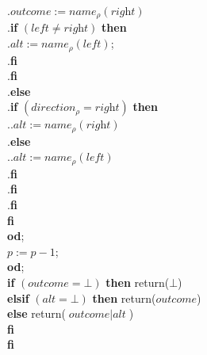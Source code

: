 \documentclass[adraft]{eptcs}
\begin{document}
\quad \quad \quad \quad .\quad \quad \quad \quad $\textit{outcome} := \textit{name}_\rho(\textit{right})$ \\ \mbox{}
\quad \quad \quad \quad .\quad \quad \quad \quad \textbf{if} $(\textit{left} \neq \textit{right})$ \textbf{then} \\ \mbox{}
\quad \quad \quad \quad .\quad \quad \quad \quad \quad $\textit{alt} := \textit{name}_\rho(\textit{left})$; \\ \mbox{}
\quad \quad \quad \quad .\quad \quad \quad \quad \textbf{fi} \\ \mbox{}
\quad \quad \quad \quad .\quad \quad \quad \textbf{fi} \\ \mbox{}
\quad \quad \quad \quad .\quad \quad \textbf{else} \\ \mbox{}
\quad \quad \quad \quad .\quad \quad \quad  \textbf{if} $(\textit{direction}_\rho = \textit{right})$ \textbf{then} \\ \mbox{}
\quad \quad \quad \quad .\quad \quad \quad \quad .$\textit{alt} := \textit{name}_\rho(\textit{right})$ \\ \mbox{}
\quad \quad \quad \quad .\quad \quad \quad  \textbf{else} \\ \mbox{}
\quad \quad \quad \quad .\quad \quad \quad \quad .$\textit{alt} := \textit{name}_\rho(\textit{left})$ \\ \mbox{}
\quad \quad \quad \quad .\quad \quad \quad \textbf{fi} \\ \mbox{}
\quad \quad \quad \quad .\quad \quad \textbf{fi} \\ \mbox{}
\quad \quad \quad \quad .\quad \textbf{fi} \\ \mbox{}
\quad \quad \quad \quad \textbf{fi} \\ \mbox{}
\quad \quad \quad \textbf{od}; \\ \mbox{}
\quad \quad \quad $p:= p-1$; \\ \mbox{}
\quad \quad \textbf{od}; \\ \mbox{}
\quad \quad \textbf{if} $(\textit{outcome} = \bot)$ \textbf{then} return($\bot$) \\ \mbox{}
\quad \quad \textbf{elsif} $(\textit{alt} = \bot)$ \textbf{then} return($\textit{outcome}$) \\ \mbox{}
\quad \quad \textbf{else} return($\textit{outcome} \mid \textit{alt}$) \\ \mbox{}
\quad \quad \textbf{fi} \\ \mbox{}
\quad \textbf{fi}




\end{document}
